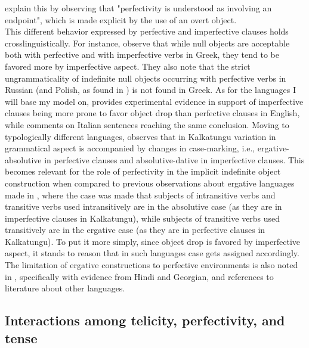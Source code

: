 \textcite[1609]{TsimpliPapadopoulou2006} explain this by observing that "perfectivity is understood as involving an endpoint", which is made explicit by the use of an overt object.\\
This different behavior expressed by perfective and imperfective clauses holds crosslinguistically. For instance, \textcite[1597]{TsimpliPapadopoulou2006} observe that while null objects are acceptable both with perfective and with imperfective verbs in Greek, they tend to be favored more by imperfective aspect. They also note \parencite[1601]{TsimpliPapadopoulou2006} that the strict ungrammaticality of indefinite null objects occurring with perfective verbs in Russian (and Polish, as found in \textcite[89]{sopata2016null}) is not found in Greek. As for the languages I will base my model on, \textcite{Medina2007} provides experimental evidence in support of imperfective clauses being more prone to favor object drop than perfective clauses in English, while \textcite{Cennamo2017} comments on Italian sentences reaching the same conclusion. Moving to typologically different languages, \textcite[118]{Naess2007} observes that in Kalkatungu variation in grammatical aspect is accompanied by changes in case-marking, i.e., ergative-absolutive in perfective clauses and absolutive-dative in imperfective clauses. This becomes relevant for the role of perfectivity in the implicit indefinite object construction when compared to previous observations about ergative languages made in , where the case was made that subjects of intransitive verbs and transitive verbs used intransitively are in the absolutive case (as they are in imperfective clauses in Kalkatungu), while subjects of transitive verbs used transitively are in the ergative case (as they are in perfective clauses in Kalkatungu). To put it more simply, since object drop is favored by imperfective aspect, it stands to reason that in such languages case gets assigned accordingly. The limitation of ergative constructions to perfective environments is also noted in \textcite[271]{HopperThompson1980}, specifically with evidence from Hindi and Georgian, and references to literature about other languages.

\subsection{Interactions among telicity, perfectivity, and tense} 

